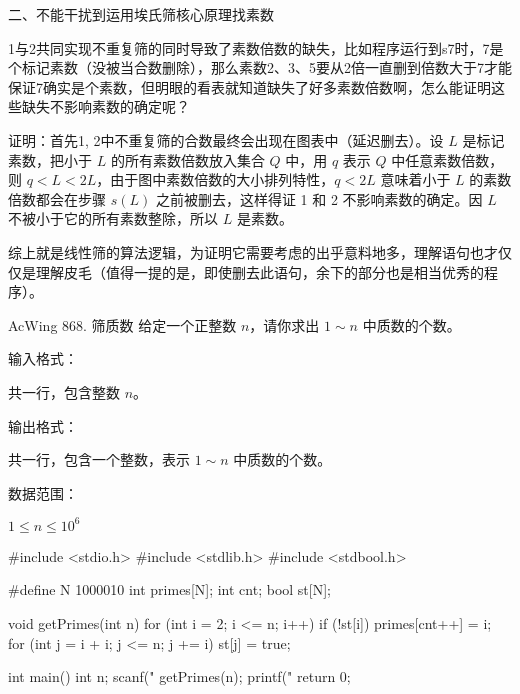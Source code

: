 二、不能干扰到运用埃氏筛核心原理找素数

1与2共同实现不重复筛的同时导致了素数倍数的缺失，比如程序运行到s7时，7是个标记素数（没被当合数删除），那么素数2、3、5要从2倍一直删到倍数大于7才能保证7确实是个素数，但明眼的看表就知道缺失了好多素数倍数啊，怎么能证明这些缺失不影响素数的确定呢？

证明：首先1, 2中不重复筛的合数最终会出现在图表中（延迟删去）。设 $L$ 是标记素数，把小于 $L$ 的所有素数倍数放入集合 $Q$ 中，用 $q$ 表示 $Q$ 中任意素数倍数，则 $q<L<2L$，由于图中素数倍数的大小排列特性，$q<2L$ 意味着小于 $L$ 的素数倍数都会在步骤 $s(L)$ 之前被删去，这样得证 1 和 2 不影响素数的确定。因 $L$ 不被小于它的所有素数整除，所以 $L$ 是素数。

综上就是线性筛的算法逻辑，为证明它需要考虑的出乎意料地多，理解语句也才仅仅是理解皮毛（值得一提的是，即使删去此语句，余下的部分也是相当优秀的程序）。

\begin{titledbox}{AcWing 868. 筛质数}
    给定一个正整数 $n$，请你求出 $1 \sim n$ 中质数的个数。

    输入格式：

    共一行，包含整数 $n$。

    输出格式：

    共一行，包含一个整数，表示 $1 \sim n$ 中质数的个数。

    数据范围：

    $1 \le n \le 10^6$

    \begin{inputblock}
    \end{inputblock}
    \begin{outputblock}
    \end{outputblock}
\end{titledbox}

\begin{mycpptwocol}[朴素筛法]
    #include <stdio.h>
    #include <stdlib.h>
    #include <stdbool.h>

    #define N 1000010
    int primes[N];
    int cnt;
    bool st[N];

    void getPrimes(int n) {
        for (int i = 2; i <= n; i++) {
            if (!st[i]) {
                primes[cnt++] = i;
            }
            for (int j = i + i; j <= n; j += i) {
                st[j] = true;
            }
        }
    }

    int main() {
        int n;
        scanf("%
        getPrimes(n);
        printf("%
        return 0;
    }
\end{mycpptwocol}

